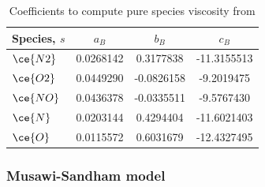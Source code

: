 \begin{table}[H]
\renewcommand{\arraystretch}{1.4}
\centering
\caption{Coefficients to compute pure species viscosity from \cite{blottner1971}}\label{table:blottnerconstants}

\begin{tabular}{l|c|c|c}
\toprule
Species, $s$ & $a_{B}$ & $b_{B}$ & $c_{B}$   \\ 
\midrule
$\ce{N2}$ & 0.0268142 & 0.3177838 & -11.3155513   \\ 
$\ce{O2}$ & 0.0449290 & -0.0826158 & -9.2019475   \\ 
$\ce{NO}$ & 0.0436378 & -0.0335511 & -9.5767430   \\ 
$\ce{N}$  & 0.0203144 & 0.4294404 & -11.6021403   \\ 
$\ce{O}$  & 0.0115572 & 0.6031679 & -12.4327495   \\ 
\bottomrule
\end{tabular}
\end{table}


\subsubsection{Musawi-Sandham model}

